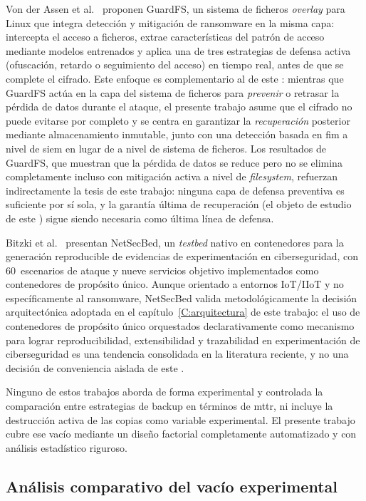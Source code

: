 \documentclass[../main.tex]{subfiles}
\begin{document}
Von der Assen et al.~\cite{vonderassen2024} proponen GuardFS, un sistema de
ficheros \emph{overlay} para Linux que integra detección y mitigación de
ransomware en la misma capa: intercepta el acceso a ficheros, extrae
características del patrón de acceso mediante modelos entrenados y aplica una de
tres estrategias de defensa activa (ofuscación, retardo o seguimiento del acceso)
en tiempo real, antes de que se complete el cifrado. Este enfoque es
complementario al de este \pfg: mientras que GuardFS actúa en la capa del sistema
de ficheros para \emph{prevenir} o retrasar la pérdida de datos durante el
ataque, el presente trabajo asume que el cifrado no puede evitarse por completo y
se centra en garantizar la \emph{recuperación} posterior mediante almacenamiento
inmutable, junto con una detección basada en \gls{fim} a nivel de \gls{siem} en
lugar de a nivel de sistema de ficheros. Los resultados de GuardFS, que muestran
que la pérdida de datos se reduce pero no se elimina completamente incluso con
mitigación activa a nivel de \emph{filesystem}, refuerzan indirectamente la tesis
de este trabajo: ninguna capa de defensa preventiva es suficiente por sí sola, y
la garantía última de recuperación (el objeto de estudio de este \pfg) sigue siendo necesaria como última línea de defensa.

Bitzki et al.~\cite{netsecbed2026} presentan NetSecBed, un \emph{testbed}
nativo en contenedores para la generación reproducible de evidencias de
experimentación en ciberseguridad, con 60~escenarios de ataque y nueve servicios
objetivo implementados como contenedores de propósito único. Aunque orientado a
entornos IoT/IIoT y no específicamente al ransomware, NetSecBed valida
metodológicamente la decisión arquitectónica adoptada en el capítulo~\ref{C:arquitectura}
de este trabajo: el uso de contenedores de propósito único orquestados
declarativamente como mecanismo para lograr reproducibilidad, extensibilidad y
trazabilidad en experimentación de ciberseguridad es una tendencia consolidada en
la literatura reciente, y no una decisión de conveniencia aislada de este \pfg.

Ninguno de estos trabajos aborda de forma experimental y controlada la
comparación entre estrategias de backup en términos de \gls{mttr}, ni
incluye la destrucción activa de las copias como variable experimental.
El presente trabajo cubre ese vacío mediante un diseño factorial
completamente automatizado y con análisis estadístico riguroso.

\subsection{Análisis comparativo del vacío experimental}
\end{document}
